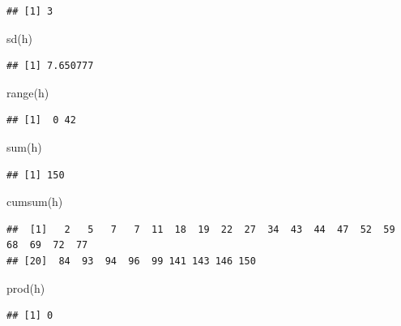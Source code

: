 \documentclass[
]{book}
\newenvironment{Shaded}{\begin{snugshade}}{\end{snugshade}}
\newcommand{\FunctionTok}[1]{\textcolor[rgb]{0.00,0.00,0.00}{#1}}
\newcommand{\NormalTok}[1]{#1}
\theoremstyle{definition}
\theoremstyle{definition}
\theoremstyle{definition}
\theoremstyle{definition}
\theoremstyle{remark}
\begin{document}
\begin{verbatim}
## [1] 3
\end{verbatim}

\begin{Shaded}
\begin{Highlighting}[]
\FunctionTok{sd}\NormalTok{(h)}
\end{Highlighting}
\end{Shaded}

\begin{verbatim}
## [1] 7.650777
\end{verbatim}

\begin{Shaded}
\begin{Highlighting}[]
\FunctionTok{range}\NormalTok{(h)}
\end{Highlighting}
\end{Shaded}

\begin{verbatim}
## [1]  0 42
\end{verbatim}

\begin{Shaded}
\begin{Highlighting}[]
\FunctionTok{sum}\NormalTok{(h)}
\end{Highlighting}
\end{Shaded}

\begin{verbatim}
## [1] 150
\end{verbatim}

\begin{Shaded}
\begin{Highlighting}[]
\FunctionTok{cumsum}\NormalTok{(h)}
\end{Highlighting}
\end{Shaded}

\begin{verbatim}
##  [1]   2   5   7   7  11  18  19  22  27  34  43  44  47  52  59  68  69  72  77
## [20]  84  93  94  96  99 141 143 146 150
\end{verbatim}

\begin{Shaded}
\begin{Highlighting}[]
\FunctionTok{prod}\NormalTok{(h)}
\end{Highlighting}
\end{Shaded}

\begin{verbatim}
## [1] 0
\end{verbatim}
\end{document}
